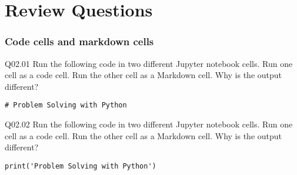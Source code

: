 \documentclass{book}
\newenvironment{problems}{}{}  %
\begin{document}
    
        \hypertarget{review-questions}{%
\section{Review Questions}\label{review-questions}}
    




    
        \begin{problems}
        \hypertarget{code-cells-and-markdown-cells}{%
\subsubsection{Code cells and markdown
cells}\label{code-cells-and-markdown-cells}}

Q02.01 Run the following code in two different Jupyter notebook cells.
Run one cell as a code cell. Run the other cell as a Markdown cell. Why
is the output different?

\begin{lstlisting}
# Problem Solving with Python
\end{lstlisting}

Q02.02 Run the following code in two different Jupyter notebook cells.
Run one cell as a code cell. Run the other cell as a Markdown cell. Why
is the output different?

\begin{lstlisting}
print('Problem Solving with Python')
\end{lstlisting}
        \end{problems}

    
\end{document}
